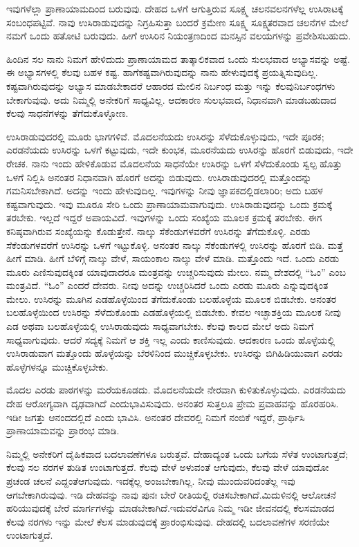 ಇವುಗಳೆಲ್ಲಾ ಪ್ರಾಣಾಯಾಮದಿಂದ ಬರುವುವು. ದೇಹದ ಒಳಗೆ ಆಗುತ್ತಿರುವ ಸೂಕ್ಷ್ಮ ಚಲನವಲನಗಳೆಲ್ಲ ಉಸಿರಾಟಕ್ಕೆ ಸಂಬಂಧಪಟ್ಟಿವೆ. ನಾವು ಉಸಿರಾಡುವುದನ್ನು ನಿಗ್ರಹಿಸುತ್ತಾ ಬಂದರೆ ಕ್ರಮೇಣ ಸೂಕ್ಷ್ಮ ಸೂಕ್ಷ್ಮತರವಾದ ಚಲನೆಗಳ ಮೇಲೆ ನಮಗೆ ಒಂದು ಹತೋಟಿ ಬರುವುದು. ಹೀಗೆ ಉಸಿರಿನ ನಿಯಂತ್ರಣದಿಂದ ಮನಸ್ಸಿನ ವಲಯಗಳನ್ನು ಪ್ರವೇಶಿಸಬಹುದು.

ಹಿಂದಿನ ಸಲ ನಾನು ನಿಮಗೆ ಹೇಳಿದುದು ಪ್ರಾಣಾಯಾಮದ ತಾತ್ಕಾಲಿಕವಾದ ಒಂದು ಸುಲಭವಾದ ಅಭ್ಯಾಸವನ್ನು ಅಷ್ಟೆ. ಈ ಅಭ್ಯಾಸಗಳಲ್ಲಿ ಕೆಲವು ಬಹಳ ಕಷ್ಟ. ಹಾಗೆ\break ಕಷ್ಟವಾಗಿರುವುದನ್ನು ನಾನು ಹೇಳುವುದಕ್ಕೆ ಪ್ರಯತ್ನಿಸುವುದಿಲ್ಲ. ಕಷ್ಟವಾಗಿರುವುದನ್ನು ಅಭ್ಯಾಸ ಮಾಡಬೇಕಾದರೆ ಆಹಾರದ ಮೇಲಿನ ನಿರ್ಬಂಧ ಮತ್ತು ಇನ್ನು ಕೆಲವು\break ನಿರ್ಬಂಧಗಳು ಬೇಕಾಗುವುವು. ಅದು ನಿಮ್ಮಲ್ಲಿ ಅನೇಕರಿಗೆ ಸಾಧ್ಯವಿಲ್ಲ. ಆದಕಾರಣ ಸುಲಭವಾದ, ನಿಧಾನವಾಗಿ ಮಾಡಬಹುದಾದ ಕೆಲವು ಸಾಧನೆಗಳನ್ನು ತೆಗೆದುಕೊಳ್ಳೋಣ.

ಉಸಿರಾಡುವುದರಲ್ಲಿ ಮೂರು ಭಾಗಗಳಿವೆ. ಮೊದಲನೆಯದು ಉಸಿರನ್ನು ಸೆಳೆದುಕೊಳ್ಳುವುದು, ಇದೇ ಪೂರಕ; ಎರಡನೆಯದು ಉಸಿರನ್ನು ಒಳಗೆ ಕಟ್ಟುವುದು, ಇದೇ ಕುಂಭಕ, ಮೂರನೆಯದು ಉಸಿರನ್ನು ಹೊರಗೆ ಬಿಡುವುದು, ಇದೇ ರೇಚಕ. ನಾನು ಇಂದು ಹೇಳಿಕೊಡುವ ಮೊದಲನೆಯ ಸಾಧನೆಯೇ ಉಸಿರನ್ನು ಒಳಗೆ ಸೆಳೆದುಕೊಂಡು ಸ್ವಲ್ಪ ಹೊತ್ತು ಒಳಗೆ ನಿಲ್ಲಿಸಿ ಅನಂತರ ನಿಧಾನವಾಗಿ ಹೊರಗೆ ಅದನ್ನು ಬಿಡುವುದು. ಉಸಿರಾಡುವುದರಲ್ಲಿ ಮತ್ತೊಂದನ್ನು ಗಮನಿಸಬೇಕಾಗಿದೆ. ಅದನ್ನು ಇಂದು ಹೇಳುವುದಿಲ್ಲ. ಇವುಗಳನ್ನು ನೀವು ಜ್ಞಾಪಕದಲ್ಲಿಡಲಾರಿರಿ; ಅದು ಬಹಳ ಕಷ್ಟವಾಗುವುದು. ಇವು ಮೂರೂ ಸೇರಿ ಒಂದು ಪ್ರಾಣಾಯಾಮವಾಗುವುದು. ಉಸಿರಾಡುವುದನ್ನು ಒಂದು ಕ್ರಮಕ್ಕೆ ತರಬೇಕು. ಇಲ್ಲದೆ ಇದ್ದರೆ ಅಪಾಯವಿದೆ. ಇವುಗಳನ್ನು ಒಂದು ಸಂಖ್ಯೆಯ ಮೂಲಕ ಕ್ರಮಕ್ಕೆ ತರಬೇಕು. ಈಗ ಕನಿಷ್ಠವಾಗಿರುವ ಸಂಖ್ಯೆಯನ್ನು ಕೊಡುತ್ತೇನೆ. ನಾಲ್ಕು ಸೆಕೆಂಡುಗಳವರೆಗೆ ಉಸಿರನ್ನು ತೆಗೆದುಕೊಳ್ಳಿ. ಎರಡು ಸೆಕೆಂಡುಗಳವರೆಗೆ ಉಸಿರನ್ನು ಒಳಗೆ ಇಟ್ಟುಕೊಳ್ಳಿ. ಅನಂತರ ನಾಲ್ಕು ಸೆಕೆಂಡುಗಳಲ್ಲಿ ಉಸಿರನ್ನು ಹೊರಗೆ ಬಿಡಿ. ಮತ್ತೆ ಹೀಗೆ ಮಾಡಿ. ಹೀಗೆ ಬೆಳಿಗ್ಗೆ ನಾಲ್ಕು ವೇಳೆ, ಸಾಯಂಕಾಲ ನಾಲ್ಕು ವೇಳೆ ಮಾಡಿ. ಮತ್ತೊಂದು ಇದೆ. ಒಂದು ಎರಡು ಮೂರು ಎಣಿಸುವುದಕ್ಕಿಂತ ಯಾವುದಾದರೂ ಮಂತ್ರವನ್ನು ಉಚ್ಚರಿಸುವುದು ಮೇಲು. ನಮ್ಮ ದೇಶದಲ್ಲಿ “ಓಂ” ಎಂಬ ಮಂತ್ರವಿದೆ. “ಓಂ” ಎಂದರೆ ದೇವರು. ನೀವು ಅದನ್ನು ಉಚ್ಚರಿಸಿದರೆ ಒಂದು ಎರಡು ಮೂರು ಎನ್ನುವುದಕ್ಕಿಂತ ಮೇಲು. ಉಸಿರನ್ನು ಮೂಗಿನ ಎಡಹೊಳ್ಳೆಯಿಂದ ತೆಗೆದುಕೊಂಡು ಬಲಹೊಳ್ಳೆಯ ಮೂಲಕ ಬಿಡಬೇಕು. ಅನಂತರ ಬಲಹೊಳ್ಳೆಯಿಂದ ಉಸಿರನ್ನು ಸೆಳೆದುಕೊಂಡು ಎಡಹೊಳ್ಳೆಯಲ್ಲಿ ಬಿಡಬೇಕು. ಕೇವಲ ಇಚ್ಛಾಶಕ್ತಿಯ ಮೂಲಕ ನೀವು ಎಡ ಅಥವಾ ಬಲಹೊಳ್ಳೆಯಲ್ಲಿ ಉಸಿರಾಡುವುದು ಸಾಧ್ಯವಾಗಬೇಕು. ಕೆಲವು ಕಾಲದ ಮೇಲೆ ಅದು ನಿಮಗೆ ಸಾಧ್ಯವಾಗುವುದು. ಆದರೆ ಸದ್ಯಕ್ಕೆ ನಿಮಗೆ ಆ ಶಕ್ತಿ ಇಲ್ಲ ಎಂದು ಕಾಣಿಸುವುದು. ಆದಕಾರಣ ಒಂದು ಹೊಳ್ಳೆಯಲ್ಲಿ ಉಸಿರಾಡುವಾಗ ಮತ್ತೊಂದು ಹೊಳ್ಳೆಯನ್ನು ಬೆರಳಿನಿಂದ ಮುಚ್ಚಿಕೊಳ್ಳಬೇಕು. ಉಸಿರನ್ನು ಬಿಗಿಹಿಡಿಯುವಾಗ ಎರಡು ಹೊಳ್ಳೆಗಳನ್ನೂ ಮುಚ್ಚಿಕೊಳ್ಳಬೇಕು.

ಮೊದಲ ಎರಡು ಪಾಠಗಳನ್ನು ಮರೆಯಕೂಡದು. ಮೊದಲನೆಯದೇ ನೇರವಾಗಿ ಕುಳಿತುಕೊಳ್ಳುವುದು. ಎರಡನೆಯದು ದೇಹ ಆರೋಗ್ಯವಾಗಿ ದೃಢವಾಗಿದೆ ಎಂದು\break ಭಾವಿಸುವುದು. ಅನಂತರ ಸುತ್ತಲೂ ಪ್ರೇಮ ಪ್ರವಾಹವನ್ನು ಹೊರಹರಿಸಿ. ಇಡೀ ಜಗತ್ತು ಆನಂದದಲ್ಲಿದೆ ಎಂದು ಭಾವಿಸಿ. ಅನಂತರ ದೇವರಲ್ಲಿ ನಿಮಗೆ ನಂಬಿಕೆ ಇದ್ದರೆ, ಪ್ರಾರ್ಥಿಸಿ ಪ್ರಾಣಾಯಾಮವನ್ನು ಪ್ರಾರಂಭ ಮಾಡಿ.

ನಿಮ್ಮಲ್ಲಿ ಅನೇಕರಿಗೆ ದೈಹಿಕವಾದ ಬದಲಾವಣೆಗಳೂ ಬರುತ್ತವೆ. ದೇಹಾದ್ಯಂತ ಒಂದು ಬಗೆಯ ಸೆಳೆತ ಉಂಟಾಗುತ್ತದೆ; ಕೆಲವು ಸಲ ನರಗಳ ತುಡಿತ ಉಂಟಾಗುತ್ತದೆ. ಕೆಲವು ವೇಳೆ ಅಳುವಂತೆ ಆಗುವುದು, ಕೆಲವು ವೇಳೆ ಯಾವುದೋ ಪ್ರಚಂಡ ಚಲನೆ ಎದ್ದಂತೆ\break ಆಗುವುದು. ಇದಕ್ಕೆಲ್ಲ ಅಂಜಬೇಕಾಗಿಲ್ಲ. ನೀವು ಮುಂದುವರಿದಂತೆಲ್ಲ ಇವು ಆಗಬೇಕಾ\break ಗಿರುವುವು. ಇಡಿ ದೇಹವನ್ನು ನಾವು ಪುನಃ ಬೇರೆ ರೀತಿಯಲ್ಲಿ ರಚಿಸಬೇಕಾಗಿದೆ.\break ಮಿದುಳಿನಲ್ಲಿ ಆಲೋಚನೆ ಹರಿಯುವುದಕ್ಕೆ ಬೇರೆ ಮಾರ್ಗಗಳನ್ನು ಮಾಡಬೇಕಾಗಿದೆ.\break ಇದುವರೆವಿಗೂ ನಿಮ್ಮ ಇಡೀ ಜೀವನದಲ್ಲಿ ಕೆಲಸಮಾಡದ ಕೆಲವು ನರಗಳು ಇನ್ನು ಮೇಲೆ ಕೆಲಸ ಮಾಡುವುದಕ್ಕೆ ಪ್ರಾರಂಭಿಸುವುವು. ದೇಹದಲ್ಲಿ ಬದಲಾವಣೆಗಳ ಸರಣಿಯೇ ಉಂಟಾಗುತ್ತದೆ.

